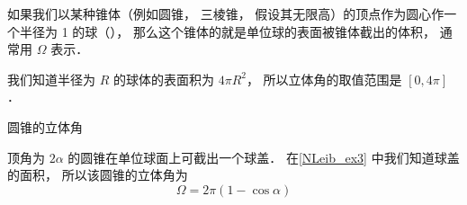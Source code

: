 
如果我们以某种锥体（例如圆锥， 三棱锥， 假设其无限高）的顶点作为圆心作一个半径为 1 的球（）， 那么这个锥体的就是单位球的表面被锥体截出的体积， 通常用 $\Omega$ 表示．

我们知道半径为 $R$ 的球体的表面积为 $4\pi R^2$， 所以立体角的取值范围是 $[0, 4\pi]$．

\begin{exam}{圆锥的立体角}

顶角为 $2\alpha$ 的圆锥在单位球面上可截出一个球盖． 在\autoref{NLeib_ex3} 中我们知道球盖的面积， 所以该圆锥的立体角为
\begin{equation}
\Omega = 2\pi (1 - \cos\alpha)
\end{equation}
\end{exam}
